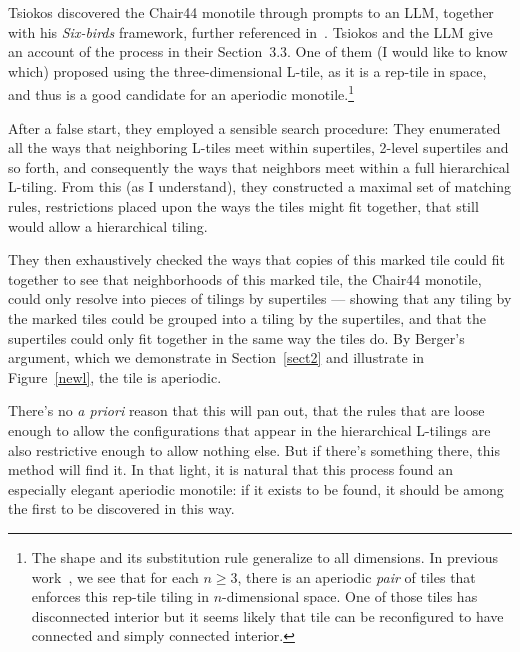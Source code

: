 \documentclass[11pt, oneside]{article}
\def\vp{\vspace{3ex}}
\begin{document}
 \vp
 Tsiokos discovered the Chair44 monotile through  prompts to an LLM, together with his  {\em Six-birds} framework, further referenced in~\cite{ioannis}.
 Tsiokos and the LLM give an account of the process in their Section~3.3. One of them (I would like to know which) proposed using the three-dimensional L-tile, as it is a rep-tile in space, and thus is a good candidate for an aperiodic monotile.\footnote{
The shape and its substitution rule generalize to all dimensions. 
In previous work~\cite{gs_en},  we see that for each $n\ge 3$, there is an aperiodic {\em pair} of tiles that enforces this rep-tile tiling in $n$-dimensional space. One of those tiles has disconnected interior but it seems likely that tile can be reconfigured to have connected and simply connected interior.}


After a false start, they employed a  sensible search procedure: They enumerated all the ways that neighboring L-tiles meet within supertiles, 2-level supertiles and so forth, and consequently the ways that neighbors meet within a full hierarchical L-tiling. From this (as I understand), they constructed a maximal set of matching rules, restrictions placed upon the ways the tiles might fit together, that still would allow a hierarchical tiling.  


They then exhaustively checked the ways that copies of this marked tile could fit together to see that neighborhoods of this marked tile, the Chair44 monotile, could only resolve into pieces of tilings by supertiles --- showing that any tiling by the marked tiles could  be grouped into a tiling by the supertiles, and that the supertiles could only fit together in the same way the tiles do. By 
Berger's argument, which we demonstrate in Section~\ref{sect2} and illustrate in Figure~\ref{newl},  the tile is aperiodic. 

There's no {\em a priori} reason that this will pan out, that the rules that are loose enough to allow the configurations that appear in the hierarchical L-tilings are also restrictive enough to allow nothing else. 
But if there's something there, this method will find it. In that light, it is natural that this process found an especially  elegant aperiodic monotile:  if it exists to be found,  it should be among the first to be discovered in this way. 

\end{document}
